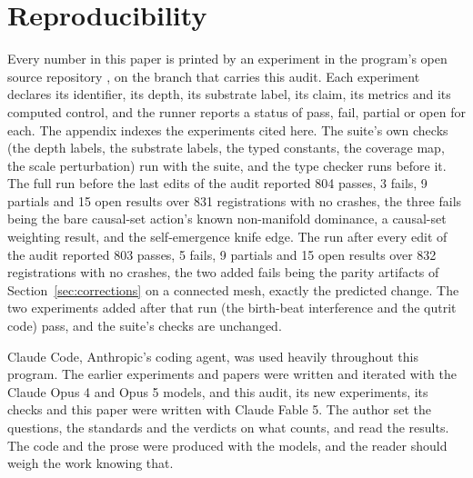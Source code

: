 \section{Reproducibility}

Every number in this paper is printed by an experiment in the program's open source repository
\cite{cluesurf2026repo}, on the branch that carries this audit. Each experiment declares its identifier, its depth,
its substrate label, its claim, its metrics and its computed control, and the runner reports a status of pass, fail,
partial or open for each. The appendix indexes the experiments cited here. The suite's own checks (the depth
labels, the substrate labels, the typed constants, the coverage map, the scale perturbation) run with the suite, and
the type checker runs before it. The full run before the last edits of the audit reported 804 passes, 3 fails, 9
partials and 15 open results over 831 registrations with no crashes, the three fails being the bare causal-set
action's known non-manifold dominance, a causal-set weighting result, and the self-emergence knife edge. The run after every
edit of the audit reported 803 passes, 5 fails, 9 partials and 15 open results over 832 registrations with no
crashes, the two added fails being the parity artifacts of Section~\ref{sec:corrections} on a connected mesh, exactly
the predicted change. The two experiments added after that run (the birth-beat interference and the qutrit code)
pass, and the suite's checks are unchanged.

Claude Code, Anthropic's coding agent, was used heavily throughout this program. The earlier experiments and papers
were written and iterated with the Claude Opus 4 and Opus 5 models, and this audit, its new experiments, its checks
and this paper were written with Claude Fable 5. The author set the questions, the standards and the verdicts on
what counts, and read the results. The code and the prose were produced with the models, and the reader should
weigh the work knowing that.
